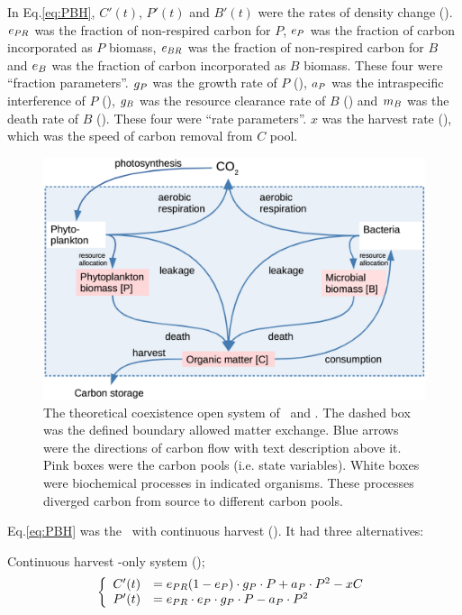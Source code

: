 \documentclass[../thesis.tex]{subfiles} %
\begin{document}
In Eq.\ref{eq:PBH}, $C'(t)$, $P'(t)$ and $B'(t)$ were the rates of density change (\dxdt).  $e_{PR}$ was the fraction of non-respired carbon for $P$, $e_P$ was the fraction of carbon incorporated as $P$ biomass, $e_{BR}$ was the fraction of non-respired carbon for $B$ and $e_B$ was the fraction of carbon incorporated as $B$ biomass.  These four were ``fraction parameters”.  $g_P$ was the growth rate of $P$ (\dayU), $a_P$ was the intraspecific interference of $P$ (\denI), $g_B$ was the resource clearance rate of $B$  (\denI) and $m_B$ was the death rate of $B$ (\dayU).  These four were ``rate parameters”.  $x$ was the harvest rate (\dayU), which was the speed of carbon removal from $C$ pool.

\begin{figure}[H]
    \centering
    \includegraphics[width=.8\linewidth]{media/model.png}
    \caption[Model visualization]{The theoretical coexistence open system of \phy\ and \bac.  The dashed box was the defined boundary allowed matter exchange.  Blue arrows were the directions of carbon flow with text description above it.  Pink boxes were the carbon pools (i.e. state variables).  White boxes were biochemical processes in indicated organisms.  These processes diverged carbon from source to different carbon pools.}
    \label{f:model}
\end{figure}

Eq.\ref{eq:PBH} was the \pbs\ with continuous harvest (\PBH).  It had three alternatives:

Continuous harvest \phy-only system (\PoH);
\begin{equation}\left\{\begin{array}{rl}
    C'(t) &= e_{PR}(1-e_P)\cdot g_P\cdot P +a_P\cdot P^2 -xC\\
    P'(t) &= e_{PR}\cdot e_P\cdot g_P\cdot P -a_P\cdot P^2
\end{array}\right.\label{eq:PoH}\end{equation}
\end{document}
